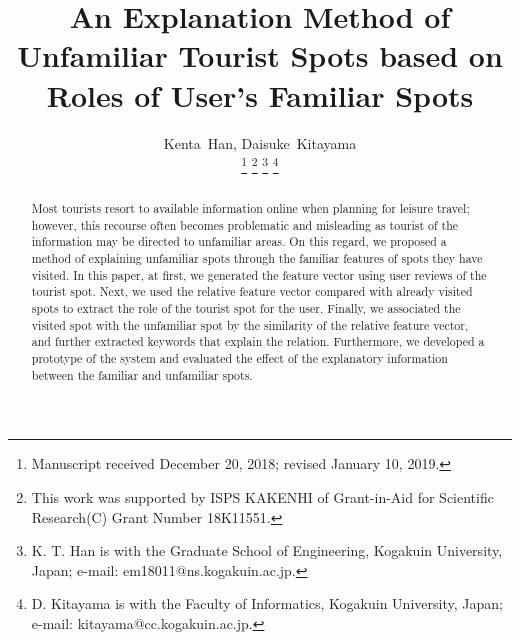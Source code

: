 \documentclass[journal]{IAENGtran}
\begin{document}
\title{An Explanation Method of Unfamiliar Tourist Spots based on Roles of User's Familiar Spots}
\author{Kenta~Han, Daisuke~Kitayama

\thanks{Manuscript received December 20, 2018; revised January 10, 2019. }
\thanks{This work was supported by ISPS KAKENHI of Grant-in-Aid for Scientific Research(C) Grant Number 18K11551. }
\thanks{K. T. Han is with the Graduate School of Engineering, Kogakuin University, Japan; e-mail: em18011@ns.kogakuin.ac.jp.}%
\thanks{D. Kitayama is with the Faculty of Informatics, Kogakuin University, Japan;  e-mail: kitayama@cc.kogakuin.ac.jp.}}%


\maketitle

\pagestyle{empty}
\thispagestyle{empty}

\begin{abstract}
Most tourists resort to available information online when planning for leisure travel; however, this recourse often becomes problematic and misleading as tourist of the information may be directed to unfamiliar areas.
On this regard, we proposed a method of explaining unfamiliar spots through the familiar features of spots they have visited.
In this paper, at first, we generated the feature vector using user reviews of the tourist spot.
Next, we used the relative feature vector compared with already visited spots to extract the role of the tourist spot for the user.
Finally, we associated the visited spot with the unfamiliar spot by the similarity of the relative feature vector, and further extracted keywords that explain the relation.
Furthermore, we developed a prototype of the system and evaluated the effect of the explanatory information between the familiar and unfamiliar spots.
\end{abstract}
\end{document}
